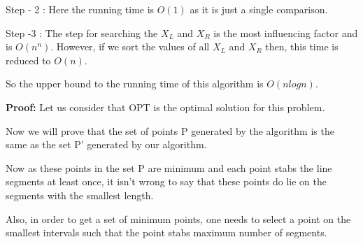 \documentclass[letterpaper,portrait,12pt]{article}
\begin{document}
\begin{flushleft}
Step - 2 : Here the running time is $O(1)$ as it is just a single comparison.
\end{flushleft}


\begin{flushleft}
Step -3 : The step for searching the $X_L $ and $X_R$ is the most influencing factor and is $O(n^n)$. However, if we sort the values of all $X_L$ and $X_R$ then, this time is reduced to $O(n)$.
\end{flushleft}


\begin{flushleft}

\end{flushleft}


\begin{flushleft}
So the upper bound to the running time of this algorithm is $O(nlogn)$.
\end{flushleft}


\begin{flushleft}

\end{flushleft}


\begin{flushleft}
\textbf{Proo}\textbf{f:} Let us consider that OPT is the optimal solution for this problem. 
\end{flushleft}


\begin{flushleft}
Now we will prove that the set of points P generated by the algorithm is the same as the set P' generated by our algorithm.
\end{flushleft}


\begin{flushleft}

\end{flushleft}


\begin{flushleft}
Now as these points in the set P are minimum and each point stabs the line segments at least once, it isn't wrong to say that these points do lie on the segments with the smallest length.
\end{flushleft}


\begin{flushleft}

\end{flushleft}


\begin{flushleft}
Also, in order to get a set of minimum points, one needs to select a point on the smallest intervals such that the point stabs maximum number of segments.
\end{flushleft}
\end{document}
